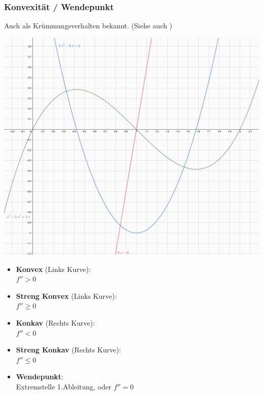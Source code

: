 \subsubsection{Konvexität / Wendepunkt}
Auch als Krümmungsverhalten bekannt. (Siehe auch )\\
\begin{minipage}{\textwidth}	
	\begin{minipage}{0.2\textwidth}
		\includegraphics[width=\linewidth,keepaspectratio=true]{./Images/konvexkonkav.png}
	\end{minipage}%
	\begin{minipage}{0.3\textwidth}	
		\begin{itemize}[nosep]
			\item \textbf{Konvex} (Links Kurve):\\ $f'' > 0$ 
			\item \textbf{Streng Konvex} (Links Kurve):\\ $f'' \geq 0$ 
			
			\item \textbf{Konkav} (Rechts Kurve):\\ $f'' < 0$ 
			\item \textbf{Streng Konkav} (Rechts Kurve):\\ $f'' \leq 0$ 
			
			\item \textbf{Wendepunkt}:\\ Extremstelle 1.Ableitung, oder $f'' = 0$
		\end{itemize}
	\end{minipage}
\end{minipage}


